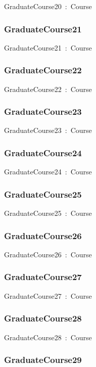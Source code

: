 \documentclass{article}
\begin{document}
GraduateCourse20~:~Course

\subsubsection*{GraduateCourse21}

GraduateCourse21~:~Course

\subsubsection*{GraduateCourse22}

GraduateCourse22~:~Course

\subsubsection*{GraduateCourse23}

GraduateCourse23~:~Course

\subsubsection*{GraduateCourse24}

GraduateCourse24~:~Course

\subsubsection*{GraduateCourse25}

GraduateCourse25~:~Course

\subsubsection*{GraduateCourse26}

GraduateCourse26~:~Course

\subsubsection*{GraduateCourse27}

GraduateCourse27~:~Course

\subsubsection*{GraduateCourse28}

GraduateCourse28~:~Course

\subsubsection*{GraduateCourse29}
\end{document}
